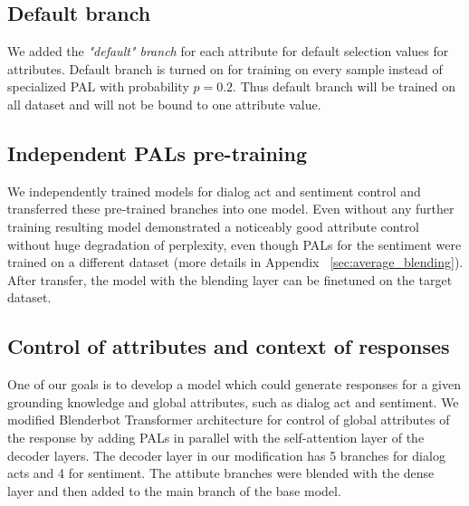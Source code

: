 \documentclass[11pt]{article}
\begin{document}
\subsection{Default branch}
We added the \textit{"default" branch} for each attribute for default selection values for attributes. 
Default branch is turned on for training on every sample instead of specialized PAL with probability $p = 0.2$. Thus default branch will be trained on all dataset and will not be bound to one attribute value.

\subsection{Independent PALs pre-training}
We independently trained models for dialog act and sentiment control and transferred these pre-trained branches into one model. Even without any further training resulting model demonstrated a noticeably good attribute control without huge degradation of perplexity, even though PALs for the sentiment were trained on a different dataset (more details in Appendix ~\ref{sec:average_blending}). After transfer, the model with the blending layer can be finetuned on the target dataset. 

\subsection{Control of attributes and context of responses}

One of our goals is to develop a model which could generate responses for a given grounding knowledge and global attributes, such as dialog act and sentiment. %
We modified Blenderbot  Transformer architecture for control of global attributes of the response by adding PALs in parallel with the self-attention layer of the decoder layers. The decoder layer in our modification has 5 branches for dialog acts and 4 for sentiment. The attibute branches were blended with the dense layer and then added to the main branch of the base model.
\end{document}
